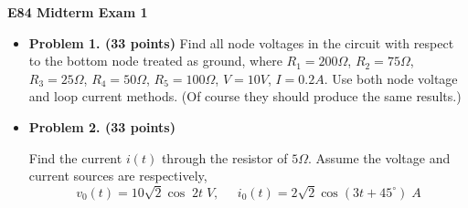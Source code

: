 \usepackage{html}

\begin{center}
{\Large \bf E84 Midterm Exam 1}
\end{center}

\begin{itemize}
\item {\bf Problem 1. (33 points)}
  Find all node voltages in the circuit with respect to the bottom node treated 
  as ground, where $R_1=200\Omega$, $R_2=75\Omega$, $R_3=25\Omega$, $R_4=50\Omega$, 
  $R_5=100\Omega$, $V=10V$, $I=0.2A$. Use both node voltage and loop current methods.
  (Of course they should produce the same results.)



\item {\bf Problem 2. (33 points)} 

  Find the current $i(t)$ through the resistor of $5\Omega$. Assume the 
  voltage and current sources are respectively, 
  \[ v_0(t)=10\sqrt{2} \cos \; 2t\; V,\;\;\;\;\; 
  i_0(t)=2\sqrt{2} \cos(3t+45^\circ)\; A \]


\end{itemize}
